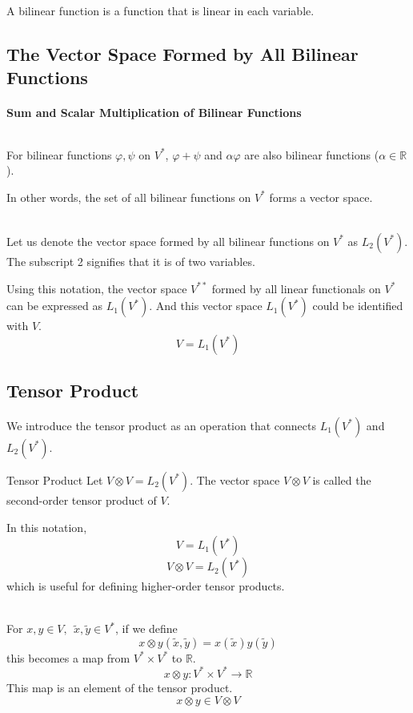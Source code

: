 \documentclass[uplatex,a4j,12pt,dvipdfmx]{jsarticle}
\begin{document}
A bilinear function is a function that is linear in each variable.

\subsection{The Vector Space Formed by All Bilinear Functions}

\paragraph{Sum and Scalar Multiplication of Bilinear Functions}

${}$

For bilinear functions $\varphi, \psi$ on $V^{*}$,
$\varphi + \psi$ and $\alpha \varphi$ are also bilinear functions
($\alpha \in \mathbb{R}$).

In other words, the set of all bilinear functions on $V^{*}$ forms a vector space.

\ \\

Let us denote the vector space formed by all bilinear functions on $V^{*}$ as $L_{2}(V^{*})$.
The subscript 2 signifies that it is of two variables.

Using this notation, the vector space $V^{**}$ formed by all linear functionals on $V^{*}$ can be
expressed as $L_{1}(V^{*})$.
And this vector space $L_{1}(V^{*})$ could be identified with $V$.
$$
	V = L_{1}(V^{*})
$$

\subsection{Tensor Product}

We introduce the tensor product as an operation that connects $L_{1}(V^{*})$ and $L_{2}(V^{*})$.

\begin{itembox}[l]{Tensor Product}
	Let $V \otimes V = L_{2}(V^{*})$.
	The vector space $V \otimes V$ is called the second-order tensor product of $V$.
\end{itembox}

In this notation,
$$V = L_{1}(V^{*})$$
$$V \otimes V = L_{2}(V^{*})$$
which is useful for defining higher-order tensor products.

\ \\

For $x,y \in V, \ \ \tilde{x}, \tilde{y} \in V^{*}$,
if we define
$$
	x \otimes y(\tilde{x}, \tilde{y}) = x(\tilde{x}) y(\tilde{y})
$$
this becomes a map from
$V^{*} \times V^{*}$
to
$\mathbb{R}$.
$$
	x \otimes y : V^{*} \times V^{*} \to \mathbb{R}
$$
This map is an element of the tensor product.
$$
	x \otimes y \in V \otimes V
$$
\end{document}
